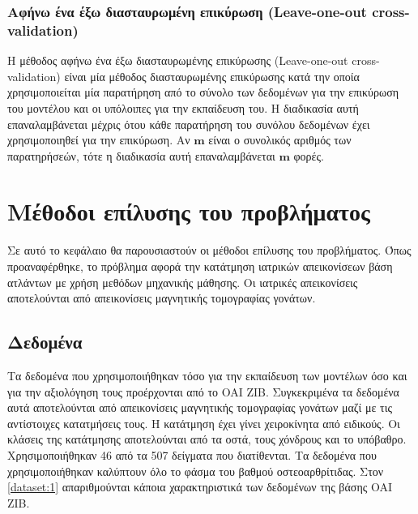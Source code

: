 \documentclass[a4paper,12pt]{article}
\begin{document}
\subsubsection{Αφήνω ένα έξω διασταυρωμένη επικύρωση (Leave-one-out
cross-validation)} \label{leave_one_out:1}

Η μέθοδος αφήνω ένα έξω διασταυρωμένης επικύρωσης (Leave-one-out
cross-validation) είναι μία μέθοδος διασταυρωμένης επικύρωσης κατά την οποία
χρησιμοποιείται μία παρατήρηση από το σύνολο των δεδομένων για την επικύρωση του
μοντέλου και οι υπόλοιπες για την εκπαίδευση του. Η διαδικασία αυτή
επαναλαμβάνεται μέχρις ότου κάθε παρατήρηση του συνόλου δεδομένων έχει
χρησιμοποιηθεί για την επικύρωση. Αν $\bm{m}$ είναι ο συνολικός αριθμός των
παρατηρήσεών, τότε η διαδικασία αυτή επαναλαμβάνεται $\bm{m}$ φορές.

\section{Μέθοδοι επίλυσης του προβλήματος}

Σε αυτό το κεφάλαιο θα παρουσιαστούν οι μέθοδοι επίλυσης του προβλήματος. Όπως
προαναφέρθηκε, το πρόβλημα αφορά την κατάτμηση ιατρικών απεικονίσεων βάση
ατλάντων με χρήση μεθόδων μηχανικής μάθησης. Οι ιατρικές απεικονίσεις
αποτελούνται από απεικονίσεις μαγνητικής τομογραφίας γονάτων.

\subsection{Δεδομένα} \label{data:1}

Τα δεδομένα που χρησιμοποιήθηκαν τόσο για την εκπαίδευση των μοντέλων όσο και
για την αξιολόγηση τους προέρχονται από το OAI ZIB. Συγκεκριμένα τα δεδομένα
αυτά αποτελούνται από απεικονίσεις μαγνητικής τομογραφίας γονάτων μαζί με τις
αντίστοιχες κατατμήσεις τους. Η κατάτμηση έχει γίνει χειροκίνητα από ειδικούς.
Οι κλάσεις της κατάτμησης αποτελούνται από τα οστά, τους χόνδρους και το
υπόβαθρο.  Χρησιμοποιήθηκαν 46 από τα 507 δείγματα που διατίθενται. Τα δεδομένα
που χρησιμοποιήθηκαν καλύπτουν όλο το φάσμα του βαθμού οστεοαρθρίτιδας. Στον
\autoref{dataset:1} απαριθμούνται κάποια χαρακτηριστικά των δεδομένων της βάσης
OAI ZIB.
\end{document}
